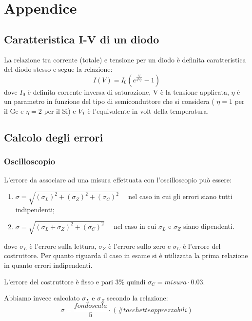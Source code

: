 \documentclass[a4paper, 11pt]{article}
\begin{document}
\newpage
\section{Appendice}

\subsection{Caratteristica I-V di un diodo} \label{sec:carIV}
La relazione tra corrente (totale) e tensione per un diodo è definita  caratteristica del diodo stesso e segue la relazione:
\begin{equation}
    I(V)=I_0 (e^{\frac{V}{\eta V_T}}-1)
    \label{eq:caratteristica IV}
\end{equation}
dove $I_0$ è definita corrente inversa di saturazione, V è la tensione applicata, $\eta$ è un parametro in funzione del tipo di semiconduttore che si considera ( $\eta = 1 $ per il Ge e $\eta = 2$ per il Si) e $V_T$ è l'equivalente in volt della temperatura.

\subsection{Calcolo degli errori} \label{sec:errori}
\subsubsection{Oscilloscopio}
L'errore da associare ad una misura effettuata con l'oscilloscopio può essere:
\begin{enumerate}
    \item $\sigma = \sqrt{(\sigma_L)^2 + (\sigma_Z)^2 + (\sigma_C)^2} \quad$ nel caso in cui gli errori siano tutti indipendenti;
    \item  $\sigma = \sqrt{(\sigma_L + \sigma_Z)^2 + (\sigma_C)^2} \quad$ nel caso in cui $\sigma_L$ e $\sigma_Z$ siano dipendenti.
    \end{enumerate}
dove $\sigma_L$ è l'errore sulla lettura, $\sigma_Z$ è l'errore sullo zero e $\sigma_C$ è l'errore del costruttore. Per quanto riguarda il caso in esame si è utilizzata la prima relazione in quanto errori indipendenti.

L'errore del costruttore è fisso e pari 3\% quindi $\sigma_C = misura \cdot 0.03$.

Abbiamo invece calcolato $\sigma_L$ e $\sigma_Z$ secondo la relazione: 
\begin{equation*}
    \sigma = \frac{fondo scala}{5} \cdot ( \# tacchette apprezzabili)
\end{equation*}
\end{document}
